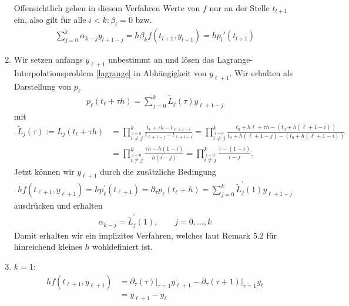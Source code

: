 \begin{solution}
\begin{enumerate}[label = \textbf{\alph*)}]
  Offensichtlich gehen in diesem Verfahren Werte von $f$ nur an der Stelle $t_{l+1}$ ein, also gilt für alle $i<k: \beta_i = 0$ bzw.
  \begin{align}\label{eqallg}
    \sum_{j=0}^k \alpha_{k-j} y_{l+1-j} = h \beta_k f(t_{l+1},y_{l+1}) = h p_l' (t_{l+1})
  \end{align}

  \item Wir setzen anfangs $y_{\ell + 1}$ unbestimmt an und lösen das Lagrange-Interpolationsproblem
  \eqref{lagrange} in Abhängigkeit von $y_{\ell + 1}$.
  Wir erhalten als Darstellung von $p_{\ell}$
  \begin{align*}
    p_{\ell}(t_{\ell} + \tau h) = \sum_{j=0}^k\tilde{L}_j(\tau)y_{\ell + 1 - j}
  \end{align*}
  mit
  \begin{align*}
    \tilde{L}_j(\tau) := L_j(t_{\ell} + \tau h) &= \prod_{\stackrel{i = 0}{i \neq j}}^{k}\frac{t_{\ell} + \tau h - t_{\ell + 1 - i}}{t_{\ell + 1 -j} - t_{\ell + 1 - i}}
    = \prod_{\stackrel{i = 0}{i \neq j}}^{k}\frac{t_0 + h{\ell} + \tau h - (t_0 + h(\ell + 1 - i))}{t_0 + h(\ell + 1 -j) - (t_0
    + h(\ell + 1 - i))} \\
    &=  \prod_{\stackrel{i = 0}{i \neq j}}^{k}\frac{\tau h - h(1 - i)}{h(i - j)}
    = \prod_{\stackrel{i = 0}{i \neq j}}^{k}\frac{\tau  - (1 - i)}{i - j}.
  \end{align*}
  Jetzt können wir $y_{\ell + 1}$ durch die zusätzliche Bedingung
  \begin{align*}
    hf(t_{\ell + 1},y_{\ell + 1}) = hp_{\ell}^{\prime}(t_{\ell + 1}) = \partial_{\tau}p_{\ell}(t_{\ell} + h) =
    \sum_{j=0}^k\tilde{L}_j^{\prime}(1)y_{\ell + 1 - j}
  \end{align*}
  ausdrücken und erhalten
  \begin{align*}
    \alpha_{k - j} = \tilde{L}_j^{\prime}(1), \qquad j = 0,\dots,k
  \end{align*}
  Damit erhalten wir ein implizites Verfahren, welches laut Remark 5.2 für
  hinreichend kleines $h$ wohldefiniert ist.
  \item $k = 1$:
  \begin{align*}
    hf(t_{\ell + 1},y_{\ell + 1}) &= \partial_{\tau}(\tau)\Bigg|_{\tau = 1}y_{\ell + 1} -
    \partial_{\tau}(\tau + 1)\Bigg|_{\tau = 1}y_{\ell} \\
    &= y_{\ell + 1} - y_{\ell}

\end{align*}
\end{enumerate}
\end{solution}
